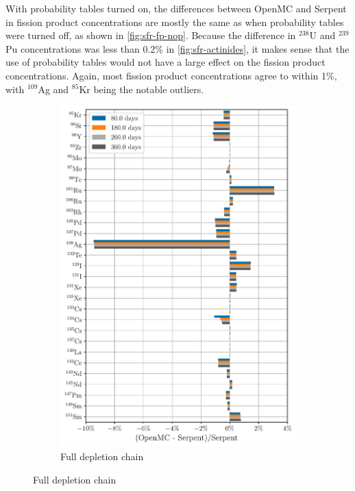 \documentclass[3p,authoryear]{elsarticle}
\begin{document}
With probability tables turned on, the differences between OpenMC and Serpent in
fission product concentrations are mostly the same as when probability tables
were turned off, as shown in \cref{fig:sfr-fp-nop}. Because the difference in
$^{238}$U and $^{239}$Pu concentrations was less than 0.2\% in
\cref{fig:sfr-actinides}, it makes sense that the use of probability tables
would not have a large effect on the fission product concentrations. Again, most
fission product concentrations agree to within 1\%, with $^{109}$Ag and
$^{85}$Kr being the notable outliers.
\begin{figure}[H]
  \centering
  \begin{subfigure}[t]{0.45\textwidth}
    \includegraphics[width=\textwidth]{figures/sfr_fp_full_average_nop.pdf}
    \caption{Full depletion chain}
  \end{subfigure}

\end{figure}
\end{document}
